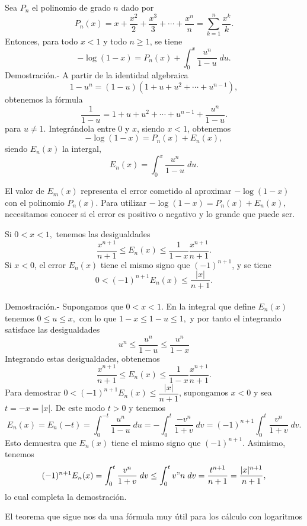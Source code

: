 \begin{teo}
    Sea $P_n$ el polinomio de grado $n$ dado por
    $$P_n(x)=x+\dfrac{x^2}{2}+\dfrac{x^3}{3}+\cdots+\dfrac{x^n}{n}=\sum_{k=1}^n \dfrac{x^k}{k}.$$
    Entonces, para todo $x<1$ y todo $n\geq 1$, se tiene
    $$-\log(1-x)=P_n(x)+\int_0^x \dfrac{u^n}{1-u}\; du.$$
	Demostración.-\; A partir de la identidad algebraica
	$$1-u^n = (1-u)\left(1+u+u^2+\cdots + u^{n-1}\right),$$
	obtenemos la fórmula
	$$\dfrac{1}{1-u}=1+u+u^2+\cdots + u^{n-1}+\dfrac{u^n}{1-u}.$$
	para $u\neq 1$. Integrándola entre $0$ y $x$, siendo $x<1$, obtenemos 
	$$-\log(1-x)=P_n(x)+E_n(x),$$
	siendo $E_n(x)$ la intergal,
	$$E_n(x)=\int_0^x \dfrac{u^n}{1-u}\; du.$$
\end{teo}

El valor de $E_m(x)$ representa el error cometido al aproximar $-\log(1-x)$ con el polinomio $P_n(x)$. Para utilizar  $-\log(1-x)=P_n(x)+E_n(x),$ necesitamos conocer si el error es positivo o negativo y lo grande que puede ser.

\begin{teo}
    Si $0<x<1,$ tenemos las desigualdades
    $$\dfrac{x^{n+1}}{n+1}\leq E_n(x)\leq \dfrac{1}{1-x}\dfrac{x^{n+1}}{n+1}.$$
    Si $x<0$, el error $E_n(x)$ tiene el mismo signo que $(-1)^{n+1}$, y se tiene
    $$0<(-1)^{n+1}E_n(x)\leq \dfrac{|x|}{n+1}.$$\\
	Demostración.-\; Supongamos que $0<x<1$. En la integral que define $E_n(x)$ tenemos $0\leq u\leq x,$ con lo que $1-x\leq 1-u\leq 1,$ y por tanto el integrando satisface las desigualdades
	$$u^n \leq \dfrac{u^n}{1-u}\leq \dfrac{u^n}{1-x}$$
	Integrando estas desigualdades, obtenemos
    $$\dfrac{x^{n+1}}{n+1}\leq E_n(x)\leq \dfrac{1}{1-x}\dfrac{x^{n+1}}{n+1}.$$
    Para demostrar $0<(-1)^{n+1}E_n(x)\leq \dfrac{|x|}{n+1}$, supongamos $x<0$ y sea $t=-x=|x|$. De este modo $t>0$ y tenemos
    $$E_n(x)=E_n(-t)=\int_0^{-t} \dfrac{u^n}{1-u}\; du=-\int_0^t\dfrac{-v^n}{1+v}\; dv = (-1)^{n+1}\int_0^t \dfrac{v^n}{1+v}\; dv.$$
    Esto demuestra que $E_n(x)$ tiene el mismo signo que $(-1)^{n+1}$. Asimismo, tenemos 
    $$(-1)^{n+1}E_n(x)=\int_0^t \dfrac{v^n}{1+v}\; dv \leq \int_0^t v"n \; dv = \dfrac{t^{n+1}}{n+1}=\dfrac{|x|^{n+1}}{n+1},$$
    lo cual completa la demostración.
\end{teo}

El teorema que sigue nos da una fórmula muy útil para los cálculo con logaritmos 


